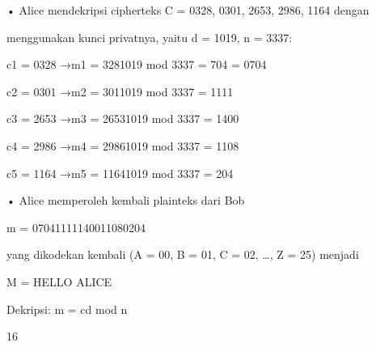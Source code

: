 \documentclass{article}
\begin{document}

• Alice mendekripsi cipherteks C = 0328, 0301, 2653, 2986, 1164 dengan 

menggunakan kunci privatnya, yaitu  d = 1019, n = 3337:


c1 = 0328 →m1 = 3281019 mod 3337 = 704 = 0704 

c2 = 0301 →m2 = 3011019 mod 3337 = 1111 

c3 = 2653 →m3 = 26531019 mod 3337 = 1400

c4 = 2986 →m4 = 29861019 mod 3337 = 1108

c5 = 1164 →m5 = 11641019 mod 3337 = 204

• Alice memperoleh kembali plainteks dari Bob 

m = 07041111140011080204 

   yang dikodekan kembali (A = 00, B = 01, C = 02, …, Z = 25) menjadi 


M = HELLO ALICE 

Dekripsi: m = cd mod n

16
\end{document}

